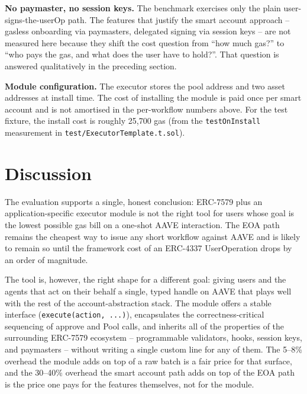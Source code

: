 \textbf{No paymaster, no session keys.} The benchmark exercises only the
plain user-signs-the-userOp path. The features that justify the smart
account approach -- gasless onboarding via paymasters, delegated signing
via session keys -- are not measured here because they shift the cost
question from ``how much gas?'' to ``who pays the gas, and what does the
user have to hold?''. That question is answered qualitatively in the
preceding section.

\textbf{Module configuration.} The executor stores the pool address and two
asset addresses at install time. The cost of installing the module is paid
once per smart account and is not amortised in the per-workflow numbers
above. For the test fixture, the install cost is roughly 25{,}700 gas
(from the \texttt{testOnInstall} measurement in
\texttt{test/ExecutorTemplate.t.sol}).

\section{Discussion}

The evaluation supports a single, honest conclusion: ERC-7579 plus an
application-specific executor module is not the right tool for users whose
goal is the lowest possible gas bill on a one-shot AAVE interaction. The
EOA path remains the cheapest way to issue any short workflow against AAVE
and is likely to remain so until the framework cost of an ERC-4337
UserOperation drops by an order of magnitude.

The tool is, however, the right shape for a different goal: giving users
and the agents that act on their behalf a single, typed handle on AAVE that
plays well with the rest of the account-abstraction stack. The module
offers a stable interface (\texttt{execute(action, ...)}), encapsulates the
correctness-critical sequencing of approve and Pool calls, and inherits all
of the properties of the surrounding ERC-7579 ecosystem -- programmable
validators, hooks, session keys, and paymasters -- without writing a single
custom line for any of them. The 5--8\% overhead the module adds on top of
a raw batch is a fair price for that surface, and the 30--40\% overhead
the smart account path adds on top of the EOA path is the price one pays
for the features themselves, not for the module.
